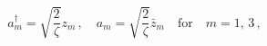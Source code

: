 \begin{equation}
 a^{\dagger}_m=\sqrt{\frac{2}{\zeta}}z_m\,,\quad 
 a_m=\sqrt{\frac{2}{\zeta}}\bar{z}_m\quad
\textrm{for}\quad m=1,\,3\,,\label{eq:4.0.3}
\end{equation}

